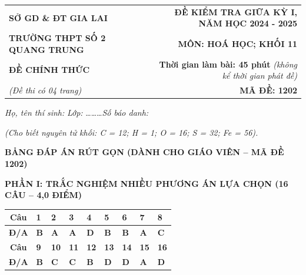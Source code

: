 \documentclass[10.5pt,a4paper]{article}
\begin{document}
\begin{tabularx}{\textwidth}{@{}l X r@{}}
\textbf{\small SỞ GD \& ĐT GIA LAI} & & \textbf{\small ĐỀ KIỂM TRA GIỮA KỲ I, NĂM HỌC 2024 - 2025} \\
\textbf{\normalsize TRƯỜNG THPT SỐ 2 QUANG TRUNG} & & \textbf{\normalsize MÔN: HOÁ HỌC; KHỐI 11} \\
\textbf{\small ĐỀ CHÍNH THỨC} & & \textbf{\small Thời gian làm bài: 45 phút} \textit{(không kể thời gian phát đề)} \\
\textit{\small (Đề thi có 04 trang)} & & \textbf{\normalsize MÃ ĐỀ: 1202}
\end{tabularx}

\vspace{2pt}
\noindent\textit{Họ, tên thí sinh:} \dotfill \quad \textit{Lớp:} \dots\dots\dots \quad \textit{Số báo danh:} \dotfill

\vspace{1pt}
\noindent\textit{\small (Cho biết nguyên tử khối: C = 12; H = 1; O = 16; S = 32; Fe = 56).}
\vspace{-2pt}
\vspace{6pt}

\begin{center}
{\color{myRed}\large\bfseries BẢNG ĐÁP ÁN RÚT GỌN (DÀNH CHO GIÁO VIÊN -- MÃ ĐỀ 1202)}\par\vspace{4pt}
\end{center}

{\color{myGreen}\bfseries PHẦN I: TRẮC NGHIỆM NHIỀU PHƯƠNG ÁN LỰA CHỌN (16 CÂU -- 4,0 ĐIỂM)}\par\vspace{2pt}
\noindent\begin{tabularx}{\textwidth}{|c|*{8}{>{\centering\arraybackslash}X|}}
\hline
\rowcolor{green!10}\textbf{Câu} & \textbf{1} & \textbf{2} & \textbf{3} & \textbf{4} & \textbf{5} & \textbf{6} & \textbf{7} & \textbf{8} \\
\hline
\textbf{Đ/A} & \textbf{\color{myRed}B} & \textbf{\color{myRed}A} & \textbf{\color{myRed}A} & \textbf{\color{myRed}D} & \textbf{\color{myRed}B} & \textbf{\color{myRed}B} & \textbf{\color{myRed}A} & \textbf{\color{myRed}C} \\
\hline
\rowcolor{green!10}\textbf{Câu} & \textbf{9} & \textbf{10} & \textbf{11} & \textbf{12} & \textbf{13} & \textbf{14} & \textbf{15} & \textbf{16} \\
\hline
\textbf{Đ/A} & \textbf{\color{myRed}B} & \textbf{\color{myRed}C} & \textbf{\color{myRed}C} & \textbf{\color{myRed}B} & \textbf{\color{myRed}D} & \textbf{\color{myRed}D} & \textbf{\color{myRed}A} & \textbf{\color{myRed}D} \\
\hline
\end{tabularx}
\end{document}
